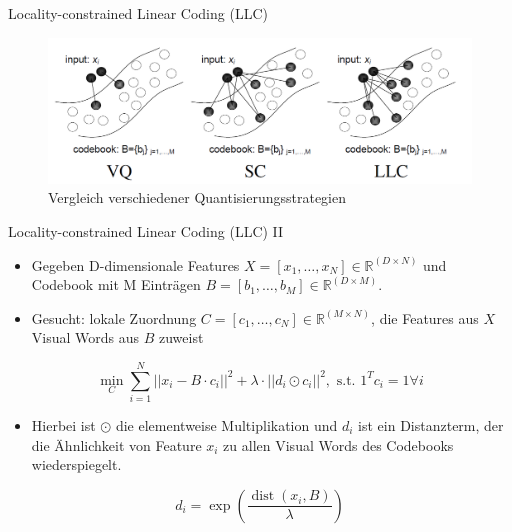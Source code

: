 \begin{frame}[t, fragile]{Locality-constrained Linear Coding (LLC)}
	\begin{figure}
		\centering
		\includegraphics[scale=0.7]{img/quant_comp.png}
		\caption{Vergleich verschiedener Quantisierungsstrategien \cite{wyylhg10}}
	\end{figure}
\end{frame}

\begin{frame}[t, fragile]{Locality-constrained Linear Coding (LLC) II}
	\begin{itemize}
		\item Gegeben D-dimensionale Features $X = [x_1, \dots, x_N] \in \mathbb{R}^{(D \times N)}$ und Codebook mit M Einträgen $B = [b_1, \dots, b_M] \in \mathbb{R}^{(D \times M)}$. 
		\item Gesucht: lokale Zuordnung $C = [c_1, \dots, c_N] \in \mathbb{R}^{(M \times N)}$, die Features aus $X$ Visual Words aus $B$ zuweist  
	\end{itemize}	 
	\begin{equation}
		\min_C \sum_{i=1}^{N} ||x_i - B\cdot c_i||^2 + \lambda\cdot ||d_i \odot c_i||^2, \text{ s.t. } 1^Tc_i = 1 \forall i
	\end{equation}
	\begin{itemize}
		\item Hierbei ist $\odot$ die elementweise Multiplikation und $d_i$ ist ein Distanzterm, der die Ähnlichkeit von Feature $x_i$ zu allen Visual Words des Codebooks wiederspiegelt.
	\end{itemize}
	\begin{equation}
		d_i = \exp \left( \frac{ \mathop{dist}(x_i, B)}{\lambda} \right)
	\end{equation}
\end{frame}

